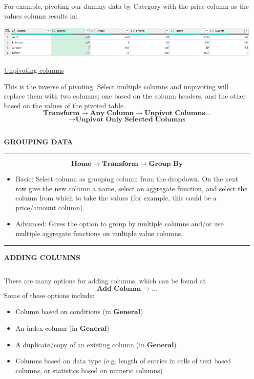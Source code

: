 \documentclass[8pt]{extarticle}
\newcommand{\heading}[1]{%
    \noindent
    \rule{\linewidth}{0.4pt}
    \begin{center}
        \vspace{-1ex}
        \textbf{#1}        
        \vspace{-2.5ex}
    \end{center}
    \rule{\linewidth}{0.4pt}
}
\begin{document}
\begin{multicols}{3}
For example, pivoting our dummy data by Category with the price column as the values column results in:
\begin{center}
    \includegraphics[width=0.98\columnwidth]{images/pivot_column.png}
\end{center}

\begin{center}
    \underline{Unpivoting columns}
\end{center}

This is the inverse of pivoting. Select multiple columns and unpivoting will replace them with two columns; one based on the column headers, and the other based on the values of the pivoted table.
\[\textbf{Transform} \rightarrow \textbf{Any Column} \rightarrow \textbf{Unpivot Columns...}\]\[ \rightarrow  \textbf{Unpivot Only Selected Columns} \]

\heading{GROUPING DATA}

\[\textbf{Home} \rightarrow \textbf{Transform} \rightarrow \textbf{Group By}\]

\begin{itemize}
    \item Basic: Select column as grouping column from the dropdown. On the next row give the new column a name, select an aggregate function, and select the column from which to take the values (for example, this could be a price/amount column).
    \item Advanced: Gives the option to group by multiple columns and/or use multiple aggregate functions on multiple value columns.
\end{itemize}

\columnbreak
\heading{ADDING COLUMNS}

There are many options for adding columns, which can be found at 
\[\textbf{Add Column} \rightarrow \dots\]
Some of these options include:
\begin{itemize}
    \item Column based on conditions (in $\textbf{General}$)
    \item An index column (in $\textbf{General}$)
    \item A duplicate/copy of an existing column  (in $\textbf{General}$)
    \item Columns based on data type (e.g. length of entries in cells of text based columns, or statistics based on numeric columns)
\end{itemize}


\end{multicols}
\end{document}
